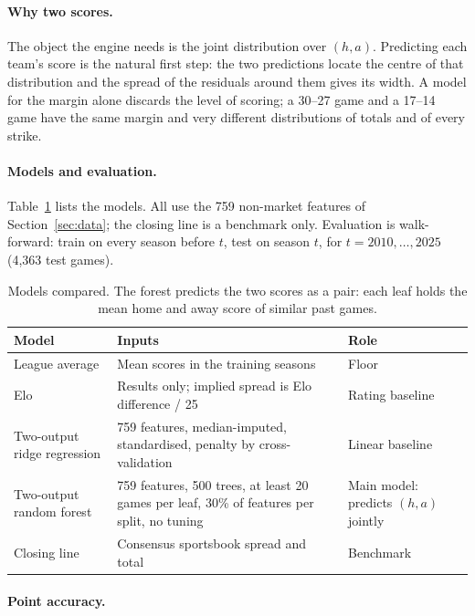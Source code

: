 \paragraph{Why two scores.}

The object the engine needs is the joint distribution over $(h,a)$. Predicting each team's score is the natural first step: the two predictions locate the centre of that distribution and the spread of the residuals around them gives its width. A model for the margin alone discards the level of scoring; a 30--27 game and a 17--14 game have the same margin and very different distributions of totals and of every strike.

\paragraph{Models and evaluation.}

Table~\ref{tab:models} lists the models. All use the 759 non-market features of Section~\ref{sec:data}; the closing line is a benchmark only. Evaluation is walk-forward: train on every season before $t$, test on season $t$, for $t = 2010,\dots,2025$ (4,363 test games).

\begin{table}[H]
\centering
\small
\begin{tabular}{p{3.6cm}p{6.2cm}p{4cm}}
\toprule
\textbf{Model} & \textbf{Inputs} & \textbf{Role} \\
\midrule
League average & Mean scores in the training seasons & Floor \\
Elo & Results only; implied spread is Elo difference / 25 & Rating baseline \\
Two-output ridge regression & 759 features, median-imputed, standardised, penalty by cross-validation & Linear baseline \\
Two-output random forest & 759 features, 500 trees, at least 20 games per leaf, 30\% of features per split, no tuning & Main model: predicts $(h,a)$ jointly \\
Closing line & Consensus sportsbook spread and total & Benchmark \\
\bottomrule
\end{tabular}
\caption{Models compared. The forest predicts the two scores as a pair: each leaf holds the mean home and away score of similar past games.}
\label{tab:models}
\end{table}

\paragraph{Point accuracy.}

